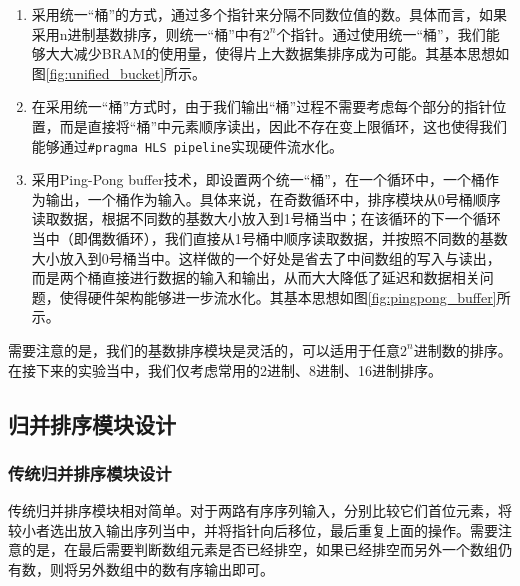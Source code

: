 \begin{enumerate}
    \item 采用统一“桶”的方式，通过多个指针来分隔不同数位值的数。具体而言，如果采用n进制基数排序，则统一“桶”中有$2^n$个指针。通过使用统一“桶”，我们能够大大减少BRAM的使用量，使得片上大数据集排序成为可能。其基本思想如图\ref{fig:unified_bucket}所示。
    \item 在采用统一“桶”方式时，由于我们输出“桶”过程不需要考虑每个部分的指针位置，而是直接将“桶”中元素顺序读出，因此不存在变上限循环，这也使得我们能够通过\verb|#pragma HLS pipeline|实现硬件流水化。
    \item 采用Ping-Pong buffer技术，即设置两个统一“桶”，在一个循环中，一个桶作为输出，一个桶作为输入。具体来说，在奇数循环中，排序模块从0号桶顺序读取数据，根据不同数的基数大小放入到1号桶当中；在该循环的下一个循环当中（即偶数循环），我们直接从1号桶中顺序读取数据，并按照不同数的基数大小放入到0号桶当中。这样做的一个好处是省去了中间数组的写入与读出，而是两个桶直接进行数据的输入和输出，从而大大降低了延迟和数据相关问题，使得硬件架构能够进一步流水化。其基本思想如图\ref{fig:pingpong_buffer}所示。
\end{enumerate}


需要注意的是，我们的基数排序模块是灵活的，可以适用于任意$2^n$进制数的排序。在接下来的实验当中，我们仅考虑常用的2进制、8进制、16进制排序。
\subsection{归并排序模块设计}
\subsubsection{传统归并排序模块设计}
传统归并排序模块相对简单。对于两路有序序列输入，分别比较它们首位元素，将较小者选出放入输出序列当中，并将指针向后移位，最后重复上面的操作。需要注意的是，在最后需要判断数组元素是否已经排空，如果已经排空而另外一个数组仍有数，则将另外数组中的数有序输出即可。
